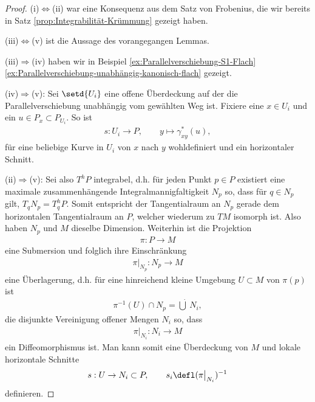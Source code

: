\documentclass[%
	paper=a5,%
	fleqn,%
	DIV=18,%
	BCOR=0mm,
	fontsize=11pt,
	titlepage=false,%
	bibliography=totoc,
	DIV=18,%
	twoside=true,
	pdftitle=Riemannsche Geometrie,
	pdfauthor=Uwe Semmelmann,
	numbers=noendperiod]%
	{scrbook}
\begin{document}
\begin{proof}
(i)$\iff$(ii) war eine Konsequenz aus dem Satz von Frobenius, die wir bereits in
Satz \ref{prop:Integrabilität-Krümmung} gezeigt haben.

(iii)$\iff$(v) ist die Aussage des vorangegangen
Lemmas.


(iii)$\Rightarrow$(iv) haben wir in Beispiel \ref{ex:Parallelverschiebung-S1-Flach} \ref{ex:Parallelverschiebung-unabhängig-kanonisch-flach} gezeigt.

(iv)$\Rightarrow$(v): Sei $\setd{U_i}$ eine offene Überdeckung auf der die Parallelverschiebung unabhängig vom gewählten Weg ist. Fixiere eine $x\in U_i$ und ein $u\in P_{x}\subset P_{U_i}$. So ist
\begin{align*}
s: U_i \to P,\qquad y \mapsto \gamma_{xy}^*(u),
\end{align*}
für eine beliebige Kurve in $U_i$ von $x$ nach $y$ wohldefiniert und ein horizontaler Schnitt.

(ii)$\Rightarrow$(v): Sei also $T^hP$ integrabel, d.h. für
jeden Punkt $p\in P$ existiert eine maximale zusammenhängende
Integralmannigfaltigkeit $N_p$ so, dass für $q\in N_p$ gilt, $T_qN_p = T_q^hP$.
Somit entspricht der Tangentialraum an $N_p$ gerade dem horizontalen
Tangentialraum an $P$, welcher wiederum zu $TM$ isomorph ist. Also haben $N_p$
und $M$ dieselbe Dimension. Weiterhin ist die Projektion
\begin{align*}
\pi: P\to M
\end{align*}
eine Submersion und folglich ihre Einschränkung
\begin{align*}
\pi\big|_{N_p} : N_p\to M
\end{align*}
eine Überlagerung, d.h. für eine hinreichend kleine Umgebung $U\subset M$ von
$\pi(p)$ ist
\begin{align*}
\pi^{-1}(U)\cap N_p = \dot{\bigcup}\, N_i,
\end{align*}
die disjunkte Vereinigung offener Mengen $N_i$ so, dass
\begin{align*}
\pi\big|_{N_i} : N_i\to M
\end{align*}
ein Diffeomorphismus ist. Man kann somit eine Überdeckung von $M$ und  lokale
horizontale Schnitte
\begin{align*}
s : U\to N_i\subset P,\qquad s_i \defl (\pi\big|_{N_i})^{-1}
\end{align*}
definieren.


\end{proof}
\end{document}
